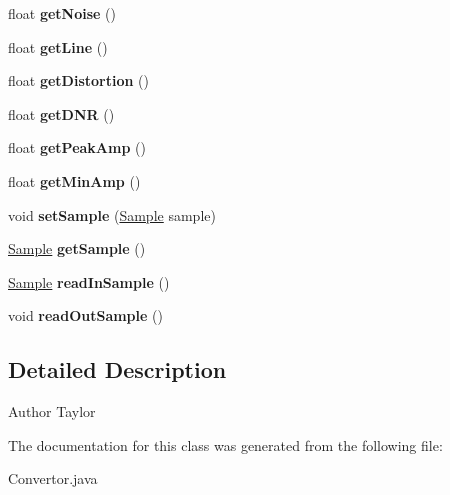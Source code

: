 \begin{DoxyCompactItemize}
\item 
\hypertarget{classConvertor_a2dea9796d78988fca070649c9cdbfe5b}{float {\bfseries get\-Noise} ()}\label{classConvertor_a2dea9796d78988fca070649c9cdbfe5b}

\item 
\hypertarget{classConvertor_a58c496fd28aef5e8f4a583dadf8fce69}{float {\bfseries get\-Line} ()}\label{classConvertor_a58c496fd28aef5e8f4a583dadf8fce69}

\item 
\hypertarget{classConvertor_aab6705c174e40a52fe89c7838ec54127}{float {\bfseries get\-Distortion} ()}\label{classConvertor_aab6705c174e40a52fe89c7838ec54127}

\item 
\hypertarget{classConvertor_a43320d5151ecb614c9af287565186b49}{float {\bfseries get\-D\-N\-R} ()}\label{classConvertor_a43320d5151ecb614c9af287565186b49}

\item 
\hypertarget{classConvertor_aad9a1d5cf8d6385931ae2ab23121d8fc}{float {\bfseries get\-Peak\-Amp} ()}\label{classConvertor_aad9a1d5cf8d6385931ae2ab23121d8fc}

\item 
\hypertarget{classConvertor_ad2102ac186360e51d742209368cf4fdb}{float {\bfseries get\-Min\-Amp} ()}\label{classConvertor_ad2102ac186360e51d742209368cf4fdb}

\item 
\hypertarget{classConvertor_aeea4867b609da0047ecb27e450e79aa8}{void {\bfseries set\-Sample} (\hyperlink{classSample}{Sample} sample)}\label{classConvertor_aeea4867b609da0047ecb27e450e79aa8}

\item 
\hypertarget{classConvertor_ad167bf64d6553655c67d8db98c194391}{\hyperlink{classSample}{Sample} {\bfseries get\-Sample} ()}\label{classConvertor_ad167bf64d6553655c67d8db98c194391}

\item 
\hypertarget{classConvertor_a12a3bf6abbcb8db546d1b0ef3e1b3bf3}{\hyperlink{classSample}{Sample} {\bfseries read\-In\-Sample} ()}\label{classConvertor_a12a3bf6abbcb8db546d1b0ef3e1b3bf3}

\item 
\hypertarget{classConvertor_ad23614472dcf0f3575be36da6989163a}{void {\bfseries read\-Out\-Sample} ()}\label{classConvertor_ad23614472dcf0f3575be36da6989163a}

\end{DoxyCompactItemize}


\subsection{Detailed Description}
\begin{DoxyAuthor}{Author}
Taylor 
\end{DoxyAuthor}


The documentation for this class was generated from the following file\-:\begin{DoxyCompactItemize}
\item 
Convertor.\-java\end{DoxyCompactItemize}
